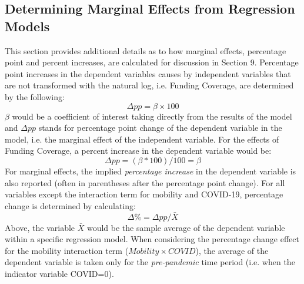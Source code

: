 \documentclass[11pt]{article} %
\begin{document}
\subsection{Determining Marginal Effects from Regression Models}

This section provides additional details as to how marginal effects, percentage point and percent increases, are calculated for discussion in Section 9. Percentage point increases in the dependent variables causes by independent variables that are not transformed with the natural log, i.e. Funding Coverage, are determined by the following:
\begin{equation*}
    \Delta pp = \beta \times 100
\end{equation*}
$\beta$ would be a coefficient of interest taking directly from the results of the model and $\Delta pp$ stands for percentage point change of the dependent variable in the model, i.e. the marginal effect of the independent variable. For the effects of Funding Coverage, a percent increase in the dependent variable would be:
\begin{equation*}
     \Delta pp = (\beta * 100) / 100 = \beta 
 \end{equation*}
For marginal effects, the implied \textit{percentage increase} in the dependent variable is also reported (often in parentheses after the percentage point change). For all variables except the interaction term for mobility and COVID-19, percentage change is determined by calculating:
\begin{equation*}
    \Delta \% =  \Delta pp / \bar{X}
\end{equation*}
Above, the variable $\bar{X}$ would be the sample average of the dependent variable within a specific regression model. When considering the percentage change effect for the mobility interaction term ($Mobility \times COVID$), the average of the dependent variable is taken only for the \textit{pre-pandemic} time period (i.e. when the indicator variable COVID=0).
\end{document}
